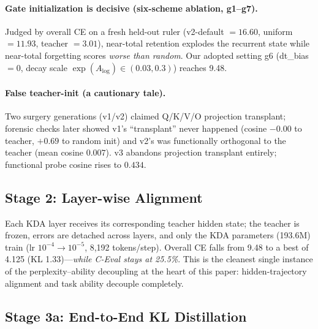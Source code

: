 \documentclass[11pt]{article}
\begin{document}
\paragraph{Gate initialization is decisive (six-scheme ablation, g1--g7).}
Judged by overall CE on a fresh held-out ruler (v2-default $=16.60$,
uniform $=11.93$, teacher $=3.01$), near-total retention explodes the
recurrent state while near-total forgetting scores \emph{worse than
random}. Our adopted setting g6 (dt\_bias $=0$, decay scale
$\exp(A_{\log}) \in (0.03, 0.3)$) reaches 9.48.

\paragraph{False teacher-init (a cautionary tale).}
Two surgery generations (v1/v2) claimed Q/K/V/O projection transplant;
forensic checks later showed v1's ``transplant'' never happened
(cosine $-0.00$ to teacher, $+0.69$ to random init) and v2's was
functionally orthogonal to the teacher (mean cosine $0.007$). v3
abandons projection transplant entirely; functional probe cosine rises
to $0.434$.

\subsection{Stage 2: Layer-wise Alignment}

Each KDA layer receives its corresponding teacher hidden state; the
teacher is frozen, errors are detached across layers, and only the KDA
parameters (193.6M) train (lr $10^{-4}{\to}10^{-5}$, 8{,}192
tokens/step). Overall CE falls from 9.48 to a best of 4.125
(KL 1.33)---\emph{while C-Eval stays at 25.5\%}. This is the cleanest
single instance of the perplexity--ability decoupling at the heart of
this paper: hidden-trajectory alignment and task ability decouple
completely.

\subsection{Stage 3a: End-to-End KL Distillation}
\label{sec:stage3a}
\end{document}
